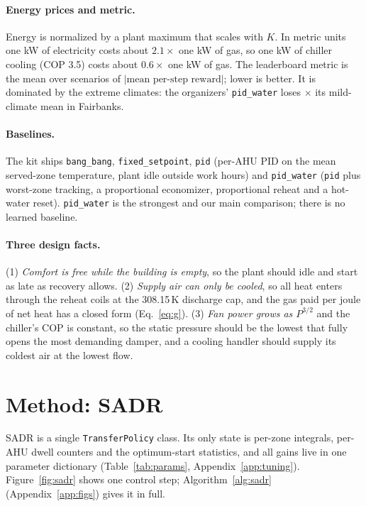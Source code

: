 \documentclass{article}
\begin{document}
\paragraph{Energy prices and metric.} Energy is normalized by a plant maximum that scales with $K$. In metric units one kW of electricity costs about $2.1\times$ one kW of gas, so one kW of chiller cooling (COP 3.5) costs about $0.6\times$ one kW of gas. The leaderboard metric is the mean over scenarios of $|\text{mean per-step reward}|$; lower is better. It is dominated by the extreme climates: the organizers' \texttt{pid\_water} loses \ExtremeRatioFairbanks$\times$ its mild-climate mean in Fairbanks.

\paragraph{Baselines.} The kit ships \texttt{bang\_bang}, \texttt{fixed\_setpoint}, \texttt{pid} (per-AHU PID on the mean served-zone temperature, plant idle outside work hours) and \texttt{pid\_water} (\texttt{pid} plus worst-zone tracking, a proportional economizer, proportional reheat and a hot-water reset). \texttt{pid\_water} is the strongest and our main comparison; there is no learned baseline.

\paragraph{Three design facts.} (1) \emph{Comfort is free while the building is empty}, so the plant should idle and start as late as recovery allows. (2) \emph{Supply air can only be cooled}, so all heat enters through the reheat coils at the 308.15\,K discharge cap, and the gas paid per joule of net heat has a closed form (Eq.~\ref{eq:g}). (3) \emph{Fan power grows as $P^{3/2}$} and the chiller's COP is constant, so the static pressure should be the lowest that fully opens the most demanding damper, and a cooling handler should supply its coldest air at the lowest flow.

\section{Method: SADR}
\label{sec:method}

SADR is a single \texttt{TransferPolicy} class. Its only state is per-zone integrals, per-AHU dwell counters and the optimum-start statistics, and all gains live in one parameter dictionary (Table~\ref{tab:params}, Appendix~\ref{app:tuning}). Figure~\ref{fig:sadr} shows one control step; Algorithm~\ref{alg:sadr} (Appendix~\ref{app:figs}) gives it in full.
\end{document}
